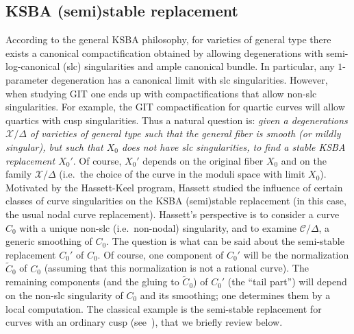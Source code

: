 \documentclass[11pt]{amsart}
\numberwithin{equation}{section}
\theoremstyle{plain}
\theoremstyle{remark}
\theoremstyle{definition}
\newcommand{\sX}{\mathscr{X}}
\begin{document}
\subsection{KSBA (semi)stable replacement} According to the general KSBA philosophy, for varieties of general type there exists a canonical compactification obtained by allowing degenerations with semi-log-canonical (slc) singularities and ample canonical bundle. In particular, any $1$-parameter degeneration has a canonical limit with slc singularities. However, when studying GIT one ends up with compactifications that allow non-slc singularities. For example, the GIT compactification for quartic curves will allow quartics with cusp singularities. Thus a natural question is: {\it given a degenerations $\sX/\Delta$ of varieties of general type such that the general fiber is smooth (or mildly singular), but such that $X_0$ does not have slc singularities, to find a stable KSBA replacement $X_0'$}. Of course, $X_0'$ depends on the original fiber $X_0$ and on the family $\sX/\Delta$ (i.e.~the choice of the curve in the moduli space with limit $X_0$). Motivated by the Hassett-Keel program, Hassett \cite{hassett} studied the influence of certain classes of curve singularities on the KSBA (semi)stable replacement (in this case, the usual nodal curve replacement). Hassett's perspective is to consider a curve $C_0$  with a unique non-slc (i.e.~non-nodal) singularity, and to examine $\mathscr C/\Delta$, a generic smoothing of $C_0$. The question is what can be said about the semi-stable replacement $C_0'$ of $C_0$. Of course, one component of $C_0'$ will be the normalization $\widetilde C_0$ of $C_0$ (assuming that this normalization is not a rational curve). The remaining components (and the gluing to $\widetilde C_0$) of $C_0'$ (the ``tail part'') will depend on the non-slc singularity of $C_0$ and its smoothing; one determines them by a local computation. The classical example is the semi-stable replacement for  curves with an ordinary cusp (see~\cite[\S3.C]{hm}), that we briefly review below. 
\end{document}
